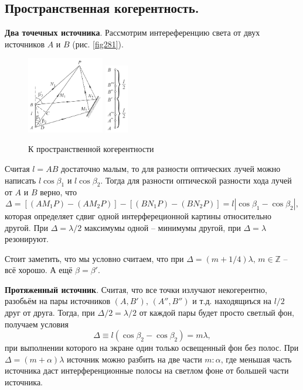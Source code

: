 \subsection{Пространственная когерентность.}


\textbf{Два точечных источника}.
Рассмотрим интереференцию света от двух источников $A$ и $B$ (рис. \eqref{fig281}). 
\begin{figure}[ht]
    \centering
    \includegraphics[width=0.3\textwidth]{figures/28_1.png}
    \hspace{5 mm} 
    \includegraphics[width=0.09\textwidth]{figures/28_2.png}
    \caption{К пространственной когерентности}
    \label{fig281}
\end{figure}
Считая $l=AB$ достаточно малым, то для разности оптических лучей можно написать $l\cos \beta_1$ и $l \cos \beta_2$. Тогда для разности оптической разности хода лучей от $A$ и $B$ верно, что
\begin{equation*}
    \Delta = 
    \left[(AM_1P)-(AM_2P)\right]-\left[(BN_1 P) - (BN_2P)\right]
   = l |\cos \beta_1 - \cos \beta_2|,
\end{equation*}
которая определяет сдвиг одной интерфереционной картины относительно другой. При $\Delta = \lambda/2$ максимумы одной -- минимумы другой, при $\Delta = \lambda$ резонируют. 

Стоит заметить, что мы условно считаем, что при $\Delta = (m+1/4)\lambda,\, m \in \mathbb{Z}$ -- всё хорошо. А ещё $\beta = \beta'$. 



\textbf{Протяженный источник}.  Считая, что все точки излучают некогерентно, разобьём на пары источников $(A, B'),\,  (A'', B'')$ и т.д. находящиъся на $l/2$ друг от друга. Тогда, при $\Delta/2 = \lambda/2$ от каждой пары будет просто светлый фон, получаем условия
\begin{equation*}
    \Delta \equiv l(\cos \beta_2 - \cos \beta_2) = m\lambda,
\end{equation*}
при выполнении которого на экране один только освещенный фон без полос. При $\Delta = (m+\alpha)\lambda$ источник можно разбить на две части $m \colon  \alpha$, где меньшая часть источника даст интерференционные полосы на светлом фоне от большей части источника. 

